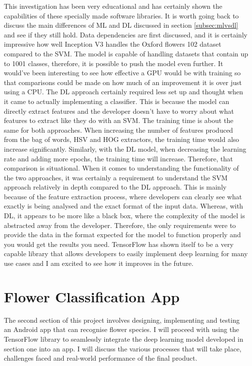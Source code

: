 \documentclass{article}
\begin{document}
This investigation has been very educational and has certainly shown the capabilities of these specially made software 
libraries. It is worth going back to discuss the main differences of ML and DL discussed in section \ref{subsec:mlvsdl}
and see if they 
still hold. Data dependencies are first discussed, and it is certainly impressive how well Inception V3 handles the 
Oxford flowers 102 dataset compared to the SVM. The model is capable of handling datasets that contain up to 1001 
classes, therefore, it is possible to push the model even further. It would've been interesting to see how effective a 
GPU would be with training so that comparisons could be made on how much of an improvement it is over just using a CPU. 
The DL approach certainly required less set up and thought when it came to actually implementing a classifier. This is 
because the model can directly extract features and the developer doesn't have to worry about what features to extract 
like they do with an SVM. The training time is about the same for both approaches. When increasing the number of 
features produced from the bag of words, HSV and HOG extractors, the training time would also increase significantly. 
Similarly, with the DL model, when decreasing the learning rate and adding more epochs, the training time will increase.
Therefore, that comparison is situational. When it comes to understanding the functionality of the two approaches, it 
was certainly a requirement to understand the SVM approach relatively in depth compared to the DL approach. This is 
mainly because of the feature extraction process, where developers can clearly see what exactly is being analysed and 
the exact format of the input data. Whereas, with DL, it appears to be more like a black box, where the complexity of 
the model is abstracted away from the developer. Therefore, the only requirements were to provide the data in the format
expected for the model to function properly and you would get the results you need. TensorFlow has shown itself to be a 
very capable library that allows developers to easily implement deep learning for many use cases and I am excited to see
how it improves in the future. 


\clearpage

\section{Flower Classification App}

The second section of this project involves designing, implementing and testing an Android app that can recognise flower
species. I will proceed with using the TensorFlow library to seamlessly integrate the deep learning model developed in 
section one into an app. I will discuss the various processes that will take place, challenges faced and real-world 
performance of the final product.
\end{document}

